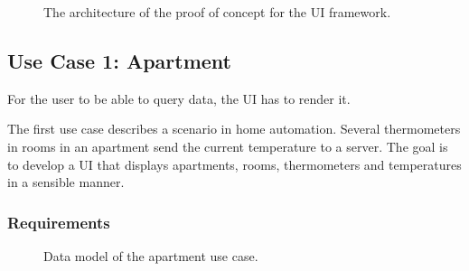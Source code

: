 \begin{figure}[!htb]
  \caption{The architecture of the proof of concept for the UI framework.}
\end{figure}

\subsection{Use Case 1: Apartment}\label{sec:usecase1}
For the user to be able to query data, the UI has to render it.

The first use case describes a scenario in home automation. Several thermometers in rooms in an apartment send the current temperature to a server. The goal is to develop a UI that displays apartments, rooms, thermometers and temperatures in a sensible manner.

\subsubsection{Requirements}

\begin{figure}[!htb]
  \caption{Data model of the apartment use case.}
\end{figure}

